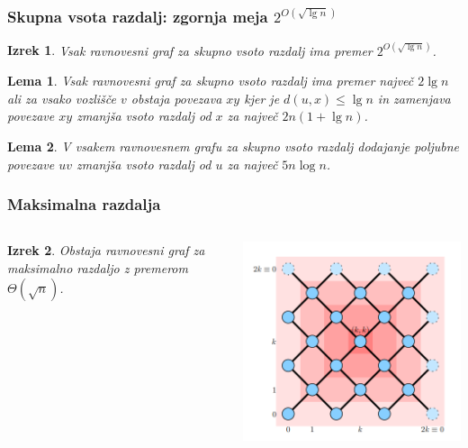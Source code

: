 \documentclass[12pt, hyperref={unicode}]{beamer}
\newtheorem{izrek}{Izrek}
\newtheorem{lema}{Lema}
\begin{document}
\begin{frame}
   
  \frametitle{Skupna vsota razdalj: zgornja meja $2^{O(\sqrt{\lg n})}$}
  \begin{izrek}
    Vsak ravnovesni graf za skupno vsoto razdalj ima premer $2^{O(\sqrt{\lg n})}$.
  \end{izrek}

  \begin{lema}
    Vsak ravnovesni graf za skupno vsoto razdalj ima premer največ $2 \lg n$ ali
    za vsako vozlišče $v$ obstaja povezava $xy$ kjer je $d(u, x) \leq \lg n$ in
    zamenjava povezave $xy$ zmanjša vsoto razdalj od $x$ za največ $2n(1 + \lg n)$.
  \end{lema}

  \begin{lema}
    V vsakem ravnovesnem grafu za skupno vsoto razdalj dodajanje poljubne povezave
    $uv$ zmanjša vsoto razdalj od $u$ za največ $5n \log n$.
  \end{lema}

\end{frame}

\begin{frame}

  \frametitle{Maksimalna razdalja}
  \begin{columns}
    \begin{izrek}
        Obstaja ravnovesni graf za maksimalno razdaljo z premerom $\Theta(\sqrt{n})$.
    \end{izrek}
    \includegraphics[width=1\textwidth]{Plagiat.png}
  \end{columns}
  
  

\end{frame}
\end{document}
